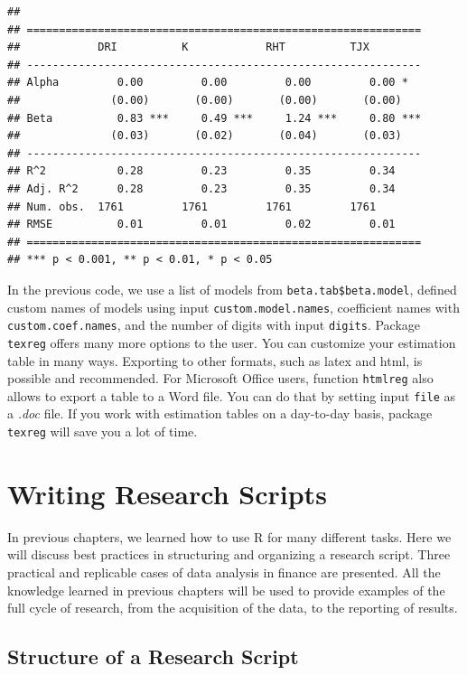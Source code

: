 \documentclass[11pt,]{book}
\begin{document}
\begin{verbatim}
## 
## =============================================================
##            DRI          K            RHT          TJX        
## -------------------------------------------------------------
## Alpha         0.00         0.00         0.00         0.00 *  
##              (0.00)       (0.00)       (0.00)       (0.00)   
## Beta          0.83 ***     0.49 ***     1.24 ***     0.80 ***
##              (0.03)       (0.02)       (0.04)       (0.03)   
## -------------------------------------------------------------
## R^2           0.28         0.23         0.35         0.34    
## Adj. R^2      0.28         0.23         0.35         0.34    
## Num. obs.  1761         1761         1761         1761       
## RMSE          0.01         0.01         0.02         0.01    
## =============================================================
## *** p < 0.001, ** p < 0.01, * p < 0.05
\end{verbatim}

In the previous code, we use a list of models from
\texttt{beta.tab\$beta.model}, defined custom names of models using
input \texttt{custom.model.names}, coefficient names with
\texttt{custom.coef.names}, and the number of digits with input
\texttt{digits}. Package \texttt{texreg} offers many more options to the
user. You can customize your estimation table in many ways. Exporting to
other formats, such as latex and html, is possible and recommended. For
Microsoft Office users, function \texttt{htmlreg} also allows to export
a table to a Word file. You can do that by setting input \texttt{file}
as a \emph{.doc} file. If you work with estimation tables on a
day-to-day basis, package \texttt{texreg} will save you a lot of time.

\hypertarget{research-scripts}{\chapter{Writing Research
Scripts}\label{research-scripts}}

In previous chapters, we learned how to use R for many different tasks.
Here we will discuss best practices in structuring and organizing a
research script. Three practical and replicable cases of data analysis
in finance are presented. All the knowledge learned in previous chapters
will be used to provide examples of the full cycle of research, from the
acquisition of the data, to the reporting of results.

\section{Structure of a Research
Script}\label{structure-of-a-research-script}
\end{document}
